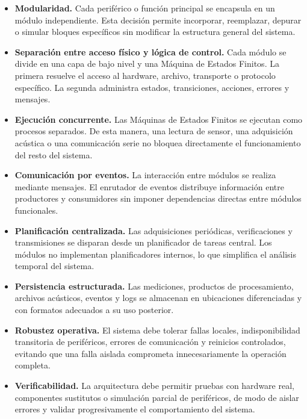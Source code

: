 \begin{itemize}
    \item \textbf{Modularidad.} Cada periférico o función principal se encapsula en un módulo independiente. Esta decisión permite incorporar, reemplazar, depurar o simular bloques específicos sin modificar la estructura general del sistema.

    \item \textbf{Separación entre acceso físico y lógica de control.} Cada módulo se divide en una capa de bajo nivel y una Máquina de Estados Finitos. La primera resuelve el acceso al hardware, archivo, transporte o protocolo específico. La segunda administra estados, transiciones, acciones, errores y mensajes.

    \item \textbf{Ejecución concurrente.} Las Máquinas de Estados Finitos se ejecutan como procesos separados. De esta manera, una lectura de sensor, una adquisición acústica o una comunicación serie no bloquea directamente el funcionamiento del resto del sistema.

    \item \textbf{Comunicación por eventos.} La interacción entre módulos se realiza mediante mensajes. El enrutador de eventos distribuye información entre productores y consumidores sin imponer dependencias directas entre módulos funcionales.

    \item \textbf{Planificación centralizada.} Las adquisiciones periódicas, verificaciones y transmisiones se disparan desde un planificador de tareas central. Los módulos no implementan planificadores internos, lo que simplifica el análisis temporal del sistema.

    \item \textbf{Persistencia estructurada.} Las mediciones, productos de procesamiento, archivos acústicos, eventos y logs se almacenan en ubicaciones diferenciadas y con formatos adecuados a su uso posterior.

    \item \textbf{Robustez operativa.} El sistema debe tolerar fallas locales, indisponibilidad transitoria de periféricos, errores de comunicación y reinicios controlados, evitando que una falla aislada comprometa innecesariamente la operación completa.

    \item \textbf{Verificabilidad.} La arquitectura debe permitir pruebas con hardware real, componentes sustitutos o simulación parcial de periféricos, de modo de aislar errores y validar progresivamente el comportamiento del sistema.
\end{itemize}

